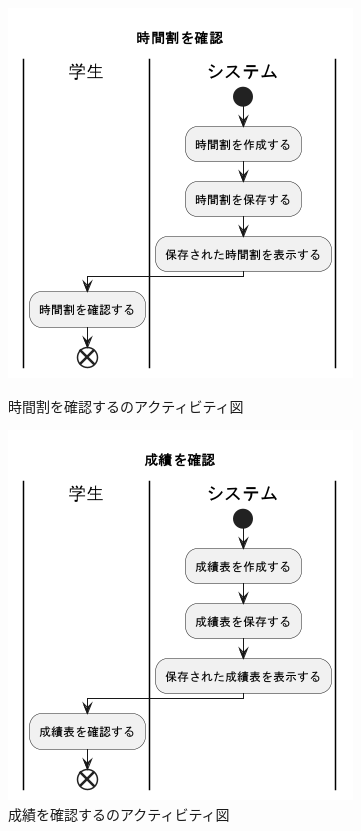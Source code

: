 \documentclass[documentclass]{jsarticle}
\begin{document}
\begin{figure}[H]
  \centering
  \begin{minipage}[b]{0.49\columnwidth}
      \centering
      \includegraphics[width=0.8\columnwidth]{figure/7-3.png}
      \caption{時間割を確認するのアクティビティ図}
      \label{fig:7-3}
  \end{minipage}
  \begin{minipage}[b]{0.49\columnwidth}
      \centering
      \includegraphics[width=0.8\columnwidth]{figure/7-4.png}
      \caption{成績を確認するのアクティビティ図}
      \label{fig:7-4}
  \end{minipage}
\end{figure}
\end{document}
